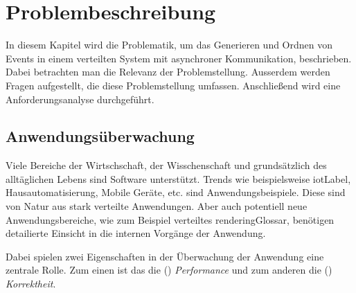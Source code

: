 %

\chapter{Problembeschreibung}
\label{chapter:Problembeschreibung}
In diesem Kapitel wird die Problematik, um das Generieren und Ordnen von Events in einem verteilten System mit asynchroner Kommunikation, beschrieben. Dabei betrachten man die Relevanz der Problemstellung. Ausserdem werden Fragen aufgestellt, die diese Problemstellung umfassen. Anschließend wird eine Anforderungsanalyse durchgeführt.

\section{Anwendungsüberwachung}
\label{section:Tracing von Anwendungen}
Viele Bereiche der Wirtschschaft, der Wisschenschaft und grundsätzlich des alltäglichen Lebens sind Software unterstützt. Trends wie beispielsweise \gls{iotLabel}, Hausautomatisierung, Mobile Geräte, etc. sind Anwendungsbeispiele. Diese sind von Natur aus stark verteilte Anwendungen. Aber auch potentiell neue Anwendungsbereiche, wie zum Beispiel verteiltes \gls{renderingGlossar}, benötigen detailierte Einsicht in die internen Vorgänge der Anwendung. 

Dabei spielen zwei Eigenschaften in der Überwachung der Anwendung eine zentrale Rolle. 
Zum einen ist das die () \emph{Performance} und zum anderen die () \emph{Korrektheit}.


